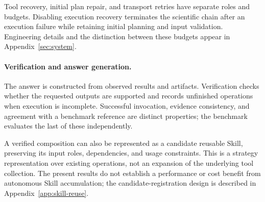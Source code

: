 Tool recovery, initial plan repair, and transport retries have separate roles and budgets. Disabling execution recovery terminates the scientific chain after an execution failure while retaining initial planning and input validation. Engineering details and the distinction between these budgets appear in Appendix~\ref{sec:system}.

\paragraph{Verification and answer generation.}
The answer is constructed from observed results and artifacts. Verification checks whether the requested outputs are supported and records unfinished operations when execution is incomplete. Successful invocation, evidence consistency, and agreement with a benchmark reference are distinct properties; the benchmark evaluates the last of these independently.

A verified composition can also be represented as a candidate reusable Skill, preserving its input roles, dependencies, and usage constraints. This is a strategy representation over existing operations, not an expansion of the underlying tool collection. The present results do not establish a performance or cost benefit from autonomous Skill accumulation; the candidate-registration design is described in Appendix~\ref{app:skill-reuse}.
